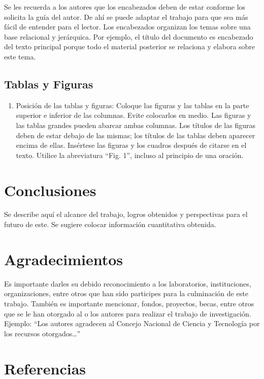     Se les recuerda a los autores que los encabezados deben de estar conforme los solicita la guía del autor. De ahí se puede adaptar el trabajo para que sea más fácil de entender para el lector.
    Los encabezados organizan los temas sobre una base relacional y jerárquica. Por ejemplo, el título del documento es encabezado del texto principal porque todo el material posterior se relaciona y elabora sobre este tema. 
    
    \subsection{Tablas y Figuras}
    
    \begin{enumerate}
        \item Posición de las tablas y figuras: Coloque las figuras y las tablas en la parte superior e inferior de las columnas. Evite colocarlos en medio. Las figuras y las tablas grandes pueden abarcar ambas columnas. Los títulos de las figuras deben de estar debajo de las mismas; los títulos de las tablas deben aparecer encima de ellas. Insértese las figuras y los cuadros después de citarse en el texto. Utilice la abreviatura “Fig. 1”, incluso al principio de una oración. 
    \end{enumerate}
    
    \section{Conclusiones}
    
    Se describe aquí el alcance del trabajo, logros obtenidos y perspectivas para el futuro de este. Se sugiere colocar información cuantitativa obtenida.
    
    \section{Agradecimientos}
    
    Es importante darles su debido reconocimiento a los laboratorios, instituciones, organizaciones, entre otros que han sido participes para la culminación de este trabajo. También es importante mencionar, fondos, proyectos, becas, entre otros que se le han otorgado al o los autores para realizar el trabajo de investigación. Ejemplo: “Los autores agradecen al Concejo Nacional de Ciencia y Tecnología por los recursos otorgados…”
    
    \section*{Referencias}
    
